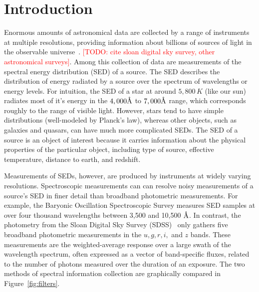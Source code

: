 \documentclass{article}
\newcommand{\angstrom}{\textup{\AA}}
\newcommand{\red}[1]{\textcolor{red}{[TODO: #1]}}
\begin{document}
\section{Introduction}
Enormous amounts of astronomical data are collected by a range of instruments at multiple resolutions, providing information about billions of sources of light in the observable universe~\cite{kent1994sdss}. \red{cite sloan digital sky survey, other astronomical surveys}.  
Among this collection of data are measurements of the spectral energy distribution (SED) of a source.  
The SED describes the distribution of energy radiated by a source over the spectrum of wavelengths or energy levels.  
For intuition, the SED of a star at around $5,800\, K$ (like our sun) radiates most of it's energy in the $4,000 \angstrom$ to $7,000\angstrom$ range, which corresponds roughly to the range of visible light.  
However, stars tend to have simple distributions (well-modeled by Planck's law), whereas other objects, such as galaxies and quasars, can have much more complicated SEDs.  
The SED of a source is an object of interest because it carries information about the physical properties of the particular object, including type of source, effective temperature, distance to earth, and redshift. 

Measurements of SEDs, however, are produced by instruments at widely varying resolutions.  
Spectroscopic measurements can can resolve noisy measurements of a source's SED in finer detail than broadband photometric measurements.  For example, the Baryonic Oscillation Spectroscopic Survey \cite{dawson2013baryon} measures SED samples at over four thousand wavelengths between 3,500 and 10,500 $\angstrom$.  
In contrast, the photometry from the Sloan Digital Sky Survey (SDSS)~\cite{kent1994sdss} only gathers five broadband photometric measurements in the $u,g,r,i,$ and $z$ bands.  These measurements are the weighted-average response over a large swath of the wavelength spectrum, often expressed as a vector of band-specific fluxes, related to the number of photons measured over the duration of an exposure.  
The two methods of spectral information collection are graphically compared in Figure~\ref{fig:filters}. 
\end{document}
